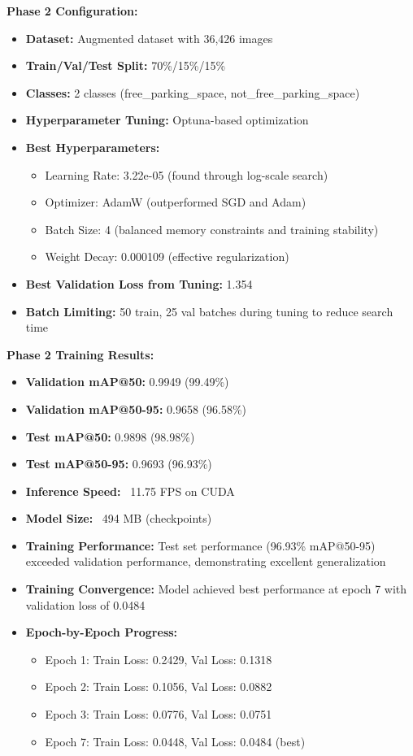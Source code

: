 \documentclass[12pt,a4paper]{article}
\begin{document}
\textbf{Phase 2 Configuration:}
\begin{itemize}
    \item \textbf{Dataset:} Augmented dataset with 36,426 images
    \item \textbf{Train/Val/Test Split:} 70\%/15\%/15\%
    \item \textbf{Classes:} 2 classes (free\_parking\_space, not\_free\_parking\_space)
    \item \textbf{Hyperparameter Tuning:} Optuna-based optimization
    \item \textbf{Best Hyperparameters:}
    \begin{itemize}
        \item Learning Rate: 3.22e-05 (found through log-scale search)
        \item Optimizer: AdamW (outperformed SGD and Adam)
        \item Batch Size: 4 (balanced memory constraints and training stability)
        \item Weight Decay: 0.000109 (effective regularization)
    \end{itemize}
    \item \textbf{Best Validation Loss from Tuning:} 1.354
    \item \textbf{Batch Limiting:} 50 train, 25 val batches during tuning to reduce search time
\end{itemize}

\textbf{Phase 2 Training Results:}
\begin{itemize}
    \item \textbf{Validation mAP@50:} 0.9949 (99.49\%)
    \item \textbf{Validation mAP@50-95:} 0.9658 (96.58\%)
    \item \textbf{Test mAP@50:} 0.9898 (98.98\%)
    \item \textbf{Test mAP@50-95:} 0.9693 (96.93\%)
    \item \textbf{Inference Speed:} ~11.75 FPS on CUDA
    \item \textbf{Model Size:} ~494 MB (checkpoints)
    \item \textbf{Training Performance:} Test set performance (96.93\% mAP@50-95) exceeded validation performance, demonstrating excellent generalization
    \item \textbf{Training Convergence:} Model achieved best performance at epoch 7 with validation loss of 0.0484
    \item \textbf{Epoch-by-Epoch Progress:}
    \begin{itemize}
        \item Epoch 1: Train Loss: 0.2429, Val Loss: 0.1318
        \item Epoch 2: Train Loss: 0.1056, Val Loss: 0.0882
        \item Epoch 3: Train Loss: 0.0776, Val Loss: 0.0751
        \item Epoch 7: Train Loss: 0.0448, Val Loss: 0.0484 (best)
    \end{itemize}
\end{itemize}
\end{document}
